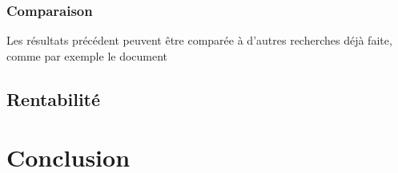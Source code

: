 \documentclass[letterpaper]{article}
\begin{document}
    \subsubsection{Comparaison}
      Les résultats précédent peuvent être comparée à d'autres recherches déjà faite,
      comme par exemple le document \cite{} %
    
    
  \subsection{Rentabilité}
    
    
\section{Conclusion}
  
  
\footnotesize
\nocite{*}



  
\newpage
\appendix
  \onecolumn
  
\end{document}
